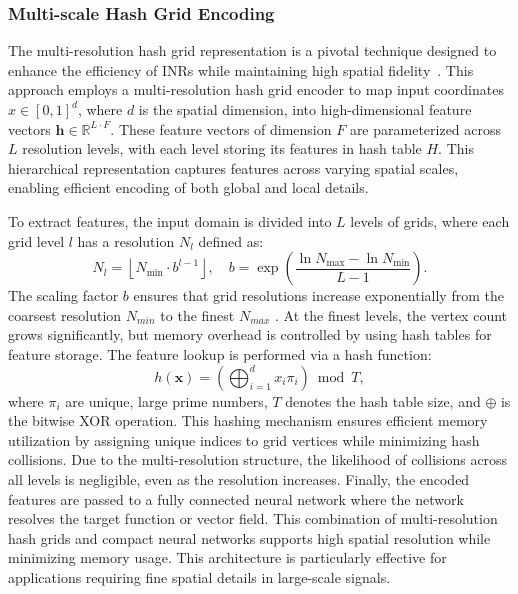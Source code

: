 \documentclass[AMA,STIX2COL]{MRM}
\begin{document}
\subsubsection{Multi-scale Hash Grid Encoding}
The multi-resolution hash grid representation is a pivotal technique designed to enhance the efficiency of INRs while maintaining high spatial fidelity~\cite{muller2022instant}. This approach employs a multi-resolution hash grid encoder to map input coordinates ${x} \in[0,1]^d$, where $d$ is the spatial dimension, into high-dimensional feature vectors $\mathbf{h} \in \mathbb{R}^{L \cdot F}$. These feature vectors of dimension $F$ are parameterized across $L$ resolution levels, with each level storing its features in hash table $H$. This hierarchical representation captures features across varying spatial scales, enabling efficient encoding of both global and local details.

To extract features, the input domain is divided into 
$L$ levels of grids, where each grid level $l$ has a resolution $N_l$ defined as:
\begin{equation}
N_l=\left\lfloor N_{\min } \cdot b^{l-1}\right\rfloor, \quad b=\exp \left(\frac{\ln N_{\max }-\ln N_{\min }}{L-1}\right).
\end{equation}
The scaling factor $b$ ensures that grid resolutions increase exponentially from the coarsest resolution 
$N_{min}$  to the finest $N_{max}$ . At the finest levels, the vertex count grows significantly, but memory overhead is controlled by using hash tables for feature storage. The feature lookup is performed via a hash function:
\begin{equation}
h(\mathbf{x})=\left(\bigoplus_{i=1}^d x_i \pi_i\right) \bmod T,
\end{equation}
where $\pi_i$ are unique, large prime numbers, $T$ denotes the hash table size, and $\oplus$ is the bitwise XOR operation. This hashing mechanism ensures efficient memory utilization by assigning unique indices to grid vertices while minimizing hash collisions. Due to the multi-resolution structure, the likelihood of collisions across all levels is negligible, even as the resolution increases.
%
Finally, the encoded features are passed to a fully connected neural network %
where the network resolves the target function or vector field. This combination of multi-resolution hash grids and compact neural networks supports high spatial resolution while minimizing memory usage. This architecture is particularly effective for applications requiring fine spatial details in large-scale signals.
\end{document}
